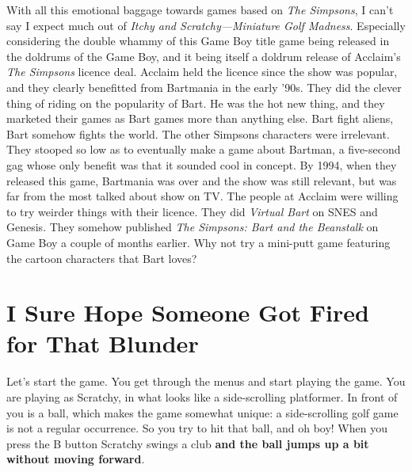 \documentclass{book}
\begin{document}
With all this emotional baggage towards games based on \emph{The Simpsons}, I can’t say I expect much out of \emph{Itchy and Scratchy—Miniature Golf Madness}. Especially considering the double whammy of this Game Boy title game being released in the doldrums of the Game Boy, and it being itself a doldrum release of Acclaim’s \emph{The Simpsons} licence deal. Acclaim held the licence since the show was popular, and they clearly benefitted from Bartmania in the early ’90s. They did the clever thing of riding on the popularity of Bart. He was the hot new thing, and they marketed their games as Bart games more than anything else. Bart fight aliens, Bart somehow fights the world. The other Simpsons characters were irrelevant. They stooped so low as to eventually make a game about Bartman, a five-second gag whose only benefit was that it sounded cool in concept. By 1994, when they released this game, Bartmania was over and the show was still relevant, but was far from the most talked about show on TV. The people at Acclaim were willing to try weirder things with their licence. They did \emph{Virtual Bart} on SNES and Genesis. They somehow published \emph{The Simpsons: Bart and the Beanstalk} on Game Boy a couple of months earlier. Why not try a mini-putt game featuring the cartoon characters that Bart loves?\par
\FloatBarrier\section*{I Sure Hope Someone Got Fired for That Blunder}
Let’s start the game. You get through the menus and start playing the game. You are playing as Scratchy, in what looks like a side-scrolling platformer. In front of you is a ball, which makes the game somewhat unique: a side-scrolling golf game is not a regular occurrence. So you try to hit that ball, and oh boy! When you press the B button Scratchy swings a club \textbf{and the ball jumps up a bit without moving forward}.\par
\end{document}
